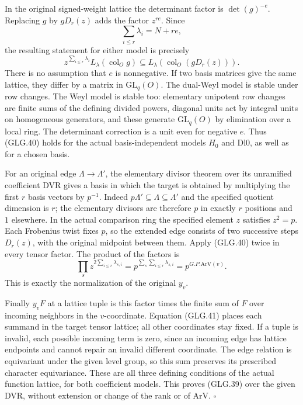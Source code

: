 In the original signed-weight lattice the determinant
factor is \(\det(g)^{-e}\). Replacing \(g\) by \(gD_r(z)\)
adds the factor \(z^{re}\). Since
\[
                 \sum_{i\le r}\lambda_i=N+re,
 \]
the resulting statement for either model is precisely
\[
 z^{\sum_{i\le r}\lambda_i}L_\lambda(\operatorname{col}_O g)
       \subseteq L_\lambda(\operatorname{col}_O(gD_r(z))).        \tag{GLG.40}
\]
There is no assumption that \(e\) is nonnegative.
If two basis matrices give the same lattice, they differ
by a matrix in \(\mathrm{GL}_q(O)\). The dual-Weyl model
is stable under row changes. The Weyl model is stable too:
elementary unipotent row changes are finite sums of the
defining divided powers, diagonal units act by integral
units on homogeneous generators, and these generate
\(\mathrm{GL}_q(O)\) by elimination over a local ring.
The determinant correction is a unit even for negative
\(e\). Thus (GLG.40) holds for the actual basis-independent
models \(H_0\) and \(\mathrm{Dl0}\), as well as for a
chosen basis.

For an original edge \(\Lambda\to\Lambda'\), the elementary
divisor theorem over its unramified coefficient DVR gives
a basis in which the target is obtained by multiplying
the first \(r\) basis vectors by \(p^{-1}\). Indeed
\(p\Lambda'\subseteq\Lambda\subseteq\Lambda'\) and the
specified quotient dimension is \(r\); the elementary
divisors are therefore \(p\) in exactly \(r\) positions
and \(1\) elsewhere. In the actual comparison ring the
specified element \(z\) satisfies \(z^2=p\). Each Frobenius
twist fixes \(p\), so the extended edge consists of two
successive steps \(D_r(z)\), with the original midpoint
between them. Apply (GLG.40) twice in every tensor factor.
The product of the factors is
\[
 \prod_s z^{2\sum_{i\le r}\lambda_{s,i}}
                         =p^{\sum_s\sum_{i\le r}\lambda_{s,i}}
                         =p^{G.P.\mathrm{ArV}(v)}.               \tag{GLG.41}
\]
This is exactly the normalization of the original \(y_v\).

Finally \(y_vF\) at a lattice tuple is this factor times
the finite sum of \(F\) over incoming neighbors in the
\(v\)-coordinate. Equation (GLG.41) places each summand
in the target tensor lattice; all other coordinates stay
fixed. If a tuple is invalid, each possible incoming
term is zero, since an incoming edge has lattice endpoints
and cannot repair an invalid different coordinate.
The edge relation is equivariant under the given level
group, so this sum preserves its prescribed character
equivariance. These are all three defining conditions of
the actual function lattice, for both coefficient models.
This proves (GLG.39) over the given DVR, without extension
or change of the rank or of \(\mathrm{ArV}\).
\hfill\(\square\)

